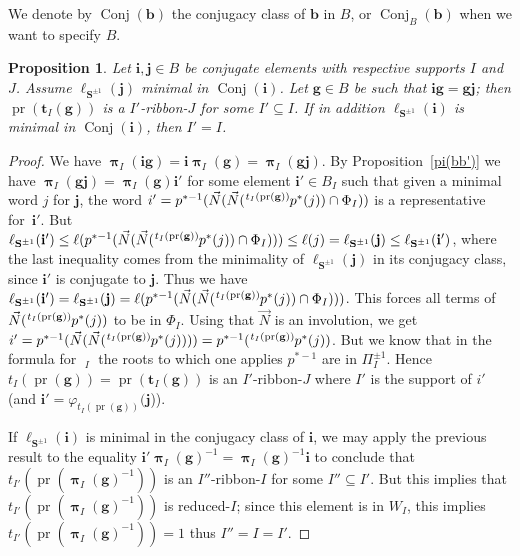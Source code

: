 \documentclass{amsart}
\numberwithin{equation}{section}
\newtheorem{proposition}[equation]{Proposition}
\newcommand\vN{\vec N}
\newcommand\lexp[2]{\kern\scriptspace\vphantom{#2}^{#1}\kern-\scriptspace#2}
\newcommand\hl{{\ell}}
\newcommand\lS{{\ell_{\bS^{\pm1}}}}
\newcommand\inv{^{-1}}
\newcommand\bb{{\mathbf b}}
\newcommand\bg{{\mathbf g}}
\newcommand\bi{{\mathbf i}}
\newcommand\bj{{\mathbf j}}
\newcommand\bt{{\mathbf t}}
\newcommand\bS{{\mathbf S}}
\DeclareMathOperator\pr{pr}
\DeclareMathOperator\hpi{\hat\pi}
\DeclareMathOperator\bpi{\boldsymbol\pi}
\DeclareMathOperator\conj{Conj}
\begin{document}
We denote by $\conj(\bb)$ \index{conj@$\conj$} the conjugacy class of $\bb$
in $B$, or $\conj_B(\bb)$ when we want to specify $B$.
\begin{proposition}\label{bg=gh}
Let  $\bi,\bj\in B$ be conjugate elements  with respective supports $I$ and
$J$. Assume $\lS(\bj)$ minimal in $\conj(\bi)$. Let $\bg\in B$ be such that
$\bi\bg=\bg  \bj$;  then  $\pr(\bt_I(\bg))$  is  a $I'$-ribbon-$J$ for some
$I'\subseteq I$. If in addition $\lS(\bi)$ is minimal in $\conj(\bi)$, then
$I'=I$.
\end{proposition}
\begin{proof}
We   have  $\bpi_I(\bi\bg)=\bi\bpi_I(\bg)=\bpi_I(\bg\bj)$.  By  
Proposition~\ref{pi(bb')}  we  have  $\bpi_I(\bg\bj)=\bpi_I(\bg)\bi'$  for some element
$\bi'\in B_I$ such that given a minimal word $j$ for $\bj$, the word
$i'=p^{*-1}(\vN(\vN(\lexp{t_I(\pr(\bg))}p^*(j))\cap\Phi_I))$ is  a
representative  for~$\bi'$.  But $\lS(\bi') \leq  \hl(
p^{*-1}(\vN(\vN(\lexp{t_I(\pr(\bg))}p^*(j))\cap\Phi_I)))\leq\hl(j)=
\lS(\bj) \leq \ell_{\bS^{\pm1}}(\bi')$, where the last inequality comes from
the minimality of $\lS(\bj)$ in its conjugacy class, since 
$\bi'$  is  conjugate  to  $\bj$.  Thus we have $\lS(\bi')=\lS(\bj) = \hl(
p^{*-1}(\vN(\vN(\lexp{t_I(\pr(\bg))}p^*(j))\cap\Phi_I)))$.   This  forces
all terms of  $\vN(\lexp{t_I(\pr(\bg))}p^*(j))$ to be in $\Phi_I$.
Using that $\vN$ is an involution, we get
$i'=p^{*-1}(\vN(\vN(\lexp{t_I(\pr(\bg))}p^*(j))))=
p^{*-1}(\lexp{t_I(\pr(\bg))}p^*(j))$.  But we know that in the formula for
$\hpi_I$  the roots  to which  one applies  $p^{*-1}$ are in $\Pi_I^{\pm1}$. Hence
$t_I(\pr(\bg))=\pr(\bt_I(\bg))$  is  an  $I'$-ribbon-$J$  where $I'$ is the
support of $i'$ (and $\bi'=\varphi_{t_I(\pr(\bg))}(\bj$)).

If $\lS(\bi)$ is minimal  in the conjugacy class of $\bi$, we may apply
the previous result to the equality $\bi'\bpi_I(\bg)\inv=\bpi_I(\bg)\inv\bi$
to conclude that $t_{I'}(\pr(\bpi_I(\bg)\inv))$ is an $I''$-ribbon-$I$ for some
$I''\subseteq I'$. But this implies that $t_{I'}(\pr(\bpi_I(\bg)\inv))$ is
reduced-$I$; since this element is in $W_I$, this implies
$t_{I'}(\pr(\bpi_I(\bg)\inv))=1$ thus $I''=I=I'$.
\end{proof}
\end{document}

